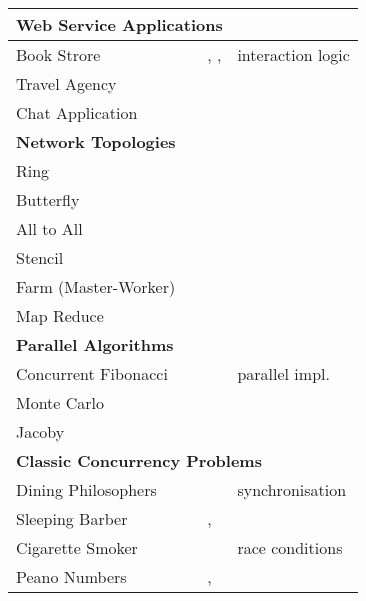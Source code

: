 \begin{table}
\begin{center}
\begin{tabular}{|l|l|l|l|}
	\hline
	\hline
	\multicolumn{4}{|l|}{ \textbf{Web Service Applications}}
	\\
	\hline
	Book Strore & \cite{W3C} & \SJ, \Mungo, \JavaAPI  & interaction logic
	\\
	Travel Agency & \cite{W3C} & \SJ &
	\\
	Chat Application & \cite{citation_needed} & \Erlang &
	\\
	\hline
	\hline
	\multicolumn{4}{|l|}{ \textbf{Network Topologies}}
	\\
	\hline
	Ring & \cite{BerkleyPar} & \MPI &
	\\
	Butterfly & \cite{BerkleyPar} & \MPI &
	\\
	All to All & \cite{BerkleyPar} & \MPI &
	\\
	Stencil & \cite{BerkleyPar} & \MPI &
	\\
	Farm (Master-Worker) & \cite{BerkleyPar} & \MPI &
	\\
	Map Reduce & \cite{BerkleyPar} & \MPI &
	\\
	\hline
	\hline
	\multicolumn{4}{|l|}{ \textbf{Parallel Algorithms}}
	\\
	\hline
	Concurrent Fibonacci & \cite{citation_needed} & \Mungo & parallel impl. 
	\\
	Monte Carlo & \cite{citation_needed} & \MPI &
	\\
	Jacoby & \cite{citation_needed} & \MPI &
	\\
	\hline
	\hline
	\multicolumn{4}{|l|}{ \textbf{Classic Concurrency Problems}}
	\\
	\hline
	Dining Philosophers & \cite{Savina} & \SPython  & synchronisation
	\\
	Sleeping Barber & \cite{Savina} & \SPython, \SScala &
	\\
	Cigarette Smoker & \cite{Savina} & \SPython & race conditions
	\\
	Peano Numbers & \cite{citation_needed} & \GV, \Links &
	\\
	\hline
	\hline


\end{tabular}
\end{center}
\end{table}
